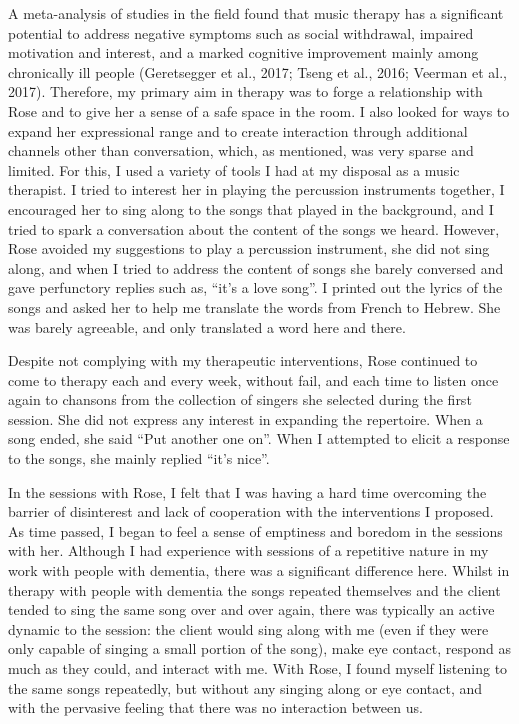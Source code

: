 \documentclass[authordate, empirical]{jote-new-article}
\begin{document}
A meta-analysis of studies in the field found that music therapy has a significant potential to address negative symptoms such as social withdrawal, impaired motivation and interest, and a marked cognitive improvement mainly among chronically ill people (Geretsegger et al., 2017; Tseng et al., 2016; Veerman et al., 2017). Therefore, my primary aim in therapy was to forge a relationship with Rose and to give her a sense of a safe space in the room. I also looked for ways to expand her expressional range and to create interaction through additional channels other than conversation, which, as mentioned, was very sparse and limited. For this, I used a variety of tools I had at my disposal as a music therapist. I tried to interest her in playing the percussion instruments together, I encouraged her to sing along to the songs that played in the background, and I tried to spark a conversation about the content of the songs we heard. However, Rose avoided my suggestions to play a percussion instrument, she did not sing along, and when I tried to address the content of songs she barely conversed and gave perfunctory replies such as, “it's a love song”. I printed out the lyrics of the songs and asked her to help me translate the words from French to Hebrew. She was barely agreeable, and only translated a word here and there.



Despite not complying with my therapeutic interventions, Rose continued to come to therapy each and every week, without fail, and each time to listen once again to chansons from the collection of singers she selected during the first session. She did not express any interest in expanding the repertoire. When a song ended, she said “Put another one on”. When I attempted to elicit a response to the songs, she mainly replied “it's nice”.



In the sessions with Rose, I felt that I was having a hard time overcoming the barrier of disinterest and lack of cooperation with the interventions I proposed. As time passed, I began to feel a sense of emptiness and boredom in the sessions with her. Although I had experience with sessions of a repetitive nature in my work with people with dementia, there was a significant difference here. Whilst in therapy with people with dementia the songs repeated themselves and the client tended to sing the same song over and over again, there was typically an active dynamic to the session: the client would sing along with me (even if they were only capable of singing a small portion of the song), make eye contact, respond as much as they could, and interact with me. With Rose, I found myself listening to the same songs repeatedly, but without any singing along or eye contact, and with the pervasive feeling that there was no interaction between us.
\end{document}
